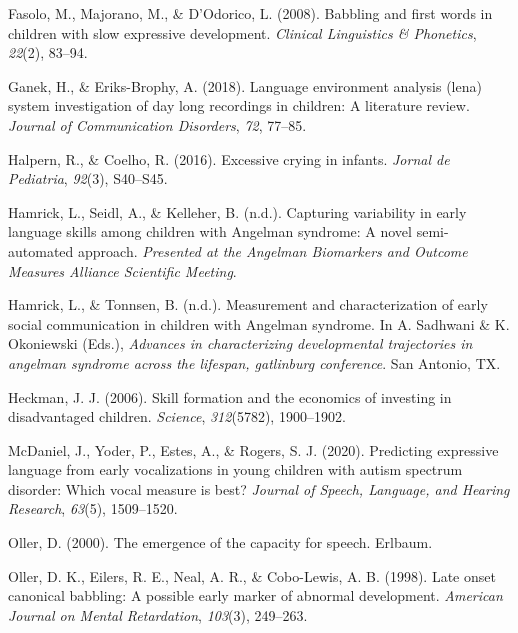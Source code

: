 \documentclass[english,,man,floatsintext]{apa6}
\begin{document}
\leavevmode\hypertarget{ref-fasolo2008babbling}{}%
Fasolo, M., Majorano, M., \& D'Odorico, L. (2008). Babbling and first words in children with slow expressive development. \emph{Clinical Linguistics \& Phonetics}, \emph{22}(2), 83--94.

\leavevmode\hypertarget{ref-ganek2018language}{}%
Ganek, H., \& Eriks-Brophy, A. (2018). Language environment analysis (lena) system investigation of day long recordings in children: A literature review. \emph{Journal of Communication Disorders}, \emph{72}, 77--85.

\leavevmode\hypertarget{ref-halpern2016excessive}{}%
Halpern, R., \& Coelho, R. (2016). Excessive crying in infants. \emph{Jornal de Pediatria}, \emph{92}(3), S40--S45.

\leavevmode\hypertarget{ref-hamrick2019capturing}{}%
Hamrick, L., Seidl, A., \& Kelleher, B. (n.d.). Capturing variability in early language skills among children with Angelman syndrome: A novel semi-automated approach. \emph{Presented at the Angelman Biomarkers and Outcome Measures Alliance Scientific Meeting}.

\leavevmode\hypertarget{ref-hamrick2019measurement}{}%
Hamrick, L., \& Tonnsen, B. (n.d.). Measurement and characterization of early social communication in children with Angelman syndrome. In A. Sadhwani \& K. Okoniewski (Eds.), \emph{Advances in characterizing developmental trajectories in angelman syndrome across the lifespan, gatlinburg conference}. San Antonio, TX.

\leavevmode\hypertarget{ref-heckman2006skill}{}%
Heckman, J. J. (2006). Skill formation and the economics of investing in disadvantaged children. \emph{Science}, \emph{312}(5782), 1900--1902.

\leavevmode\hypertarget{ref-mcdaniel2020predicting}{}%
McDaniel, J., Yoder, P., Estes, A., \& Rogers, S. J. (2020). Predicting expressive language from early vocalizations in young children with autism spectrum disorder: Which vocal measure is best? \emph{Journal of Speech, Language, and Hearing Research}, \emph{63}(5), 1509--1520.

\leavevmode\hypertarget{ref-oller2000emergence}{}%
Oller, D. (2000). The emergence of the capacity for speech. Erlbaum.

\leavevmode\hypertarget{ref-oller1998late}{}%
Oller, D. K., Eilers, R. E., Neal, A. R., \& Cobo-Lewis, A. B. (1998). Late onset canonical babbling: A possible early marker of abnormal development. \emph{American Journal on Mental Retardation}, \emph{103}(3), 249--263.
\end{document}
